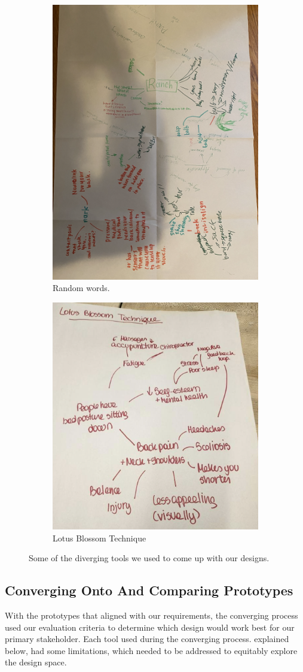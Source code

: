 \documentclass[11pt]{article}
\begin{document}
\begin{figure}[H]
\centering
\begin{subfigure}{.5\linewidth}
  \centering
  \includegraphics[width=0.6\linewidth]{real random.png}
  \caption{Random words.}
\end{subfigure}%
\begin{subfigure}{.5\linewidth}
  \centering
  \includegraphics[width=0.6\linewidth]{real lotus.png}
  \caption{Lotus Blossom Technique}
  \end{subfigure}
\caption{Some of the diverging tools we used to come up with our designs.}
\label{fig:divergingTools}
\end{figure}

\subsection{Converging Onto And Comparing Prototypes}
With the prototypes that aligned with our requirements, the converging process used our evaluation criteria to determine which design would work best for our primary stakeholder. Each tool used during the converging process. explained below, had some limitations, which needed to be addressed to equitably explore the design space.
\end{document}
